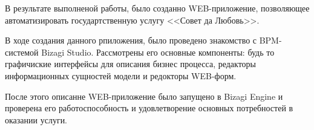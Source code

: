 \Conclusion %

В результате выполненой работы, было созданно WEB-приложение,
позволяющее автоматизировать государтственную услугу <<Совет да Любовь>>.

В ходе создания данного рпиложения, было проведено знакомство с BPM-системой
Bizagi Studio. Рассмотрены его основные компоненты: будь то графичиские
интерфейсы для описания бизнес процесса, редакторы информационных сущностей
модели и редокторы WEB-форм.

После этого описанне WEB-приложение было запущено в Bizagi Engine и проверена
его работоспособность и удовлетворение основных потребностей в оказании услуги.



